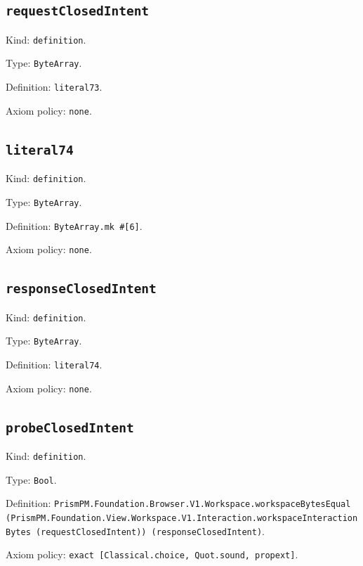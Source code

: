 \documentclass[11pt]{article}
\begin{document}
\subsection*{\texttt{requestClosedIntent}}
\noindent Kind: \texttt{definition}.\par
\noindent Type: \texttt{ByteArray}.\par
\noindent Definition: \texttt{literal73}.\par
\noindent Axiom policy: \texttt{none}.\par
\subsection*{\texttt{literal74}}
\noindent Kind: \texttt{definition}.\par
\noindent Type: \texttt{ByteArray}.\par
\noindent Definition: \texttt{ByteArray.mk \#[6]}.\par
\noindent Axiom policy: \texttt{none}.\par
\subsection*{\texttt{responseClosedIntent}}
\noindent Kind: \texttt{definition}.\par
\noindent Type: \texttt{ByteArray}.\par
\noindent Definition: \texttt{literal74}.\par
\noindent Axiom policy: \texttt{none}.\par
\subsection*{\texttt{probeClosedIntent}}
\noindent Kind: \texttt{definition}.\par
\noindent Type: \texttt{Bool}.\par
\noindent Definition: \texttt{PrismPM.Foundation.Browser.V1.Workspace.workspaceBytesEqual (PrismPM.Foundation.View.Workspace.V1.Interaction.workspaceInteractionBytes (requestClosedIntent)) (responseClosedIntent)}.\par
\noindent Axiom policy: \texttt{exact [Classical.choice, Quot.sound, propext]}.\par
\end{document}
